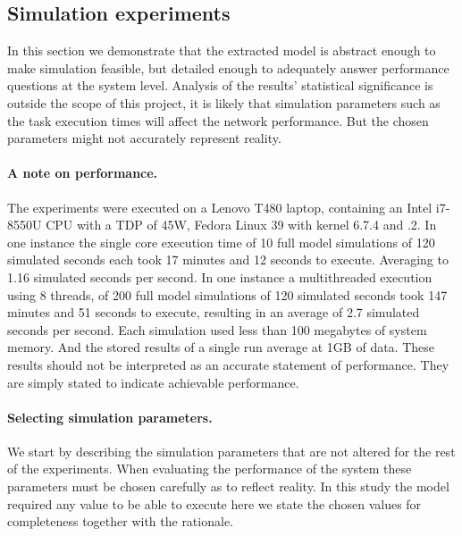 \clearpage
\subsection{Simulation experiments}
\label{sec:experiments}
In this section we demonstrate that the extracted model is abstract enough to make simulation feasible, but detailed enough to adequately answer performance questions at the system level. Analysis of the results' statistical significance is outside the scope of this project, it is likely that simulation parameters such as the task execution times will affect the network performance. But the chosen parameters might not accurately represent reality. 

\paragraph{A note on performance.} The experiments were executed on a Lenovo T480 laptop, containing an Intel i7-8550U CPU with a TDP of 45W, Fedora Linux 39 with kernel 6.7.4 and .2. In one instance the single core execution time of 10 full model simulations of 120 simulated seconds each took 17 minutes and 12 seconds to execute. Averaging to 1.16 simulated seconds per second. In one instance a multithreaded execution using 8 threads, of 200 full model simulations of 120 simulated seconds took 147 minutes and 51 seconds to execute, resulting in an average of 2.7 simulated seconds per second. Each simulation used less than 100 megabytes of system memory. And the stored results of a single run average at 1GB of data. These results should not be interpreted as an accurate statement of performance. They are simply stated to indicate achievable performance.
\paragraph{Selecting simulation parameters.}
We start by describing the simulation parameters that are not altered for the rest of the experiments. When evaluating the performance of the system these parameters must be chosen carefully as to reflect reality. In this study the model required any value to be able to execute here we state the chosen values for completeness together with the rationale.

